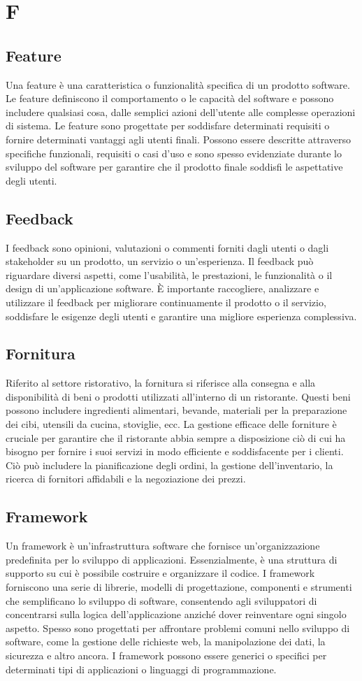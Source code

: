 \section{F} 
\subsection{Feature} 
Una feature è una caratteristica o funzionalità specifica di un prodotto software. Le feature definiscono il comportamento o le capacità del software e possono includere qualsiasi cosa, dalle semplici azioni dell'utente alle complesse operazioni di sistema. Le feature sono progettate per soddisfare determinati requisiti o fornire determinati vantaggi agli utenti finali. Possono essere descritte attraverso specifiche funzionali, requisiti o casi d'uso e sono spesso evidenziate durante lo sviluppo del software per garantire che il prodotto finale soddisfi le aspettative degli utenti.
\subsection{Feedback} 
I feedback sono opinioni, valutazioni o commenti forniti dagli utenti o dagli stakeholder su un prodotto, un servizio o un'esperienza. Il feedback può riguardare diversi aspetti, come l'usabilità, le prestazioni, le funzionalità o il design di un'applicazione software. È importante raccogliere, analizzare e utilizzare il feedback per migliorare continuamente il prodotto o il servizio, soddisfare le esigenze degli utenti e garantire una migliore esperienza complessiva.
\subsection{Fornitura} 
Riferito al settore ristorativo, la fornitura si riferisce alla consegna e alla disponibilità di beni o prodotti utilizzati all'interno di un ristorante. Questi beni possono includere ingredienti alimentari, bevande, materiali per la preparazione dei cibi, utensili da cucina, stoviglie, ecc. La gestione efficace delle forniture è cruciale per garantire che il ristorante abbia sempre a disposizione ciò di cui ha bisogno per fornire i suoi servizi in modo efficiente e soddisfacente per i clienti. Ciò può includere la pianificazione degli ordini, la gestione dell'inventario, la ricerca di fornitori affidabili e la negoziazione dei prezzi.
\subsection{Framework} 
Un framework è un'infrastruttura software che fornisce un'organizzazione predefinita per lo sviluppo di applicazioni. Essenzialmente, è una struttura di supporto su cui è possibile costruire e organizzare il codice. I framework forniscono una serie di librerie, modelli di progettazione, componenti e strumenti che semplificano lo sviluppo di software, consentendo agli sviluppatori di concentrarsi sulla logica dell'applicazione anziché dover reinventare ogni singolo aspetto. Spesso sono progettati per affrontare problemi comuni nello sviluppo di software, come la gestione delle richieste web, la manipolazione dei dati, la sicurezza e altro ancora. I framework possono essere generici o specifici per determinati tipi di applicazioni o linguaggi di programmazione.
